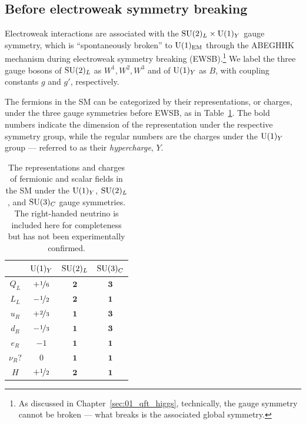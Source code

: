 \subsection{Before electroweak symmetry breaking}

Electroweak interactions are associated with the $\SU[2]_L \times \UU[1]_Y$ gauge symmetry, which is ``spontaneously broken'' to $\UU[1]_{\text{EM}}$ through the ABEGHHK mechanism during electroweak symmetry breaking (EWSB).\footnote{As discussed in Chapter~\ref{sec:01_qft_higgs}, technically, the gauge symmetry cannot be broken --- what breaks is the associated global symmetry.}
We label the three gauge bosons of $\SU[2]_L$ as $W^1, W^2, W^3$ and of $\UU[1]_Y$ as $B$, with coupling constants $g$ and $g'$, respectively.

The fermions in the SM can be categorized by their representations, or charges, under the three gauge symmetries before EWSB, as in Table~\ref{tab:01_sm_ew_fermions}.
The bold numbers indicate the dimension of the representation under the respective symmetry group, while the regular numbers are the charges under the $\UU[1]_Y$ group --- referred to as their \textit{hypercharge}, $Y$.

\begin{table}[ht]
	\renewcommand{\arraystretch}{1.5}
	\centering
	\caption{The representations and charges of fermionic and scalar fields in the SM under the $\UU[1]_Y$, $\SU[2]_L$, and $\SU[3]_C$ gauge symmetries. 
	The right-handed neutrino is included here for completeness but has not been experimentally confirmed.}
	\begin{tabular}{c|ccc}
		\toprule
		 & $\UU[1]_Y$ & $\SU[2]_L$ & $\SU[3]_C$ \\
		\midrule
		$Q_L$ & $+ \cnicefrac{1}{6}$ & $\mathbf{2}$ & $\mathbf{3}$ \\
		$L_L$ & $- \cnicefrac{1}{2}$ & $\mathbf{2}$ & $\mathbf{1}$ \\
		$u_R$ & $+ \cnicefrac{2}{3}$ & $\mathbf{1}$ & $\mathbf{3}$ \\
		$d_R$ & $- \cnicefrac{1}{3}$ & $\mathbf{1}$ & $\mathbf{3}$ \\
		$e_R$ & $-1$ & $\mathbf{1}$ & $\mathbf{1}$ \\
		$\nu_R$? & $0$ & $\mathbf{1}$ & $\mathbf{1}$ \\
		$H$ & $+ \cnicefrac{1}{2}$ & $\mathbf{2}$ & $\mathbf{1}$ \\
		\bottomrule
	\end{tabular}
	\label{tab:01_sm_ew_fermions}
\end{table}

